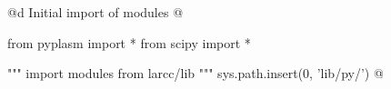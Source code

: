 @d Initial import of modules
@{from pyplasm import *
from scipy import *

""" import modules from larcc/lib """
sys.path.insert(0, 'lib/py/')
@}
